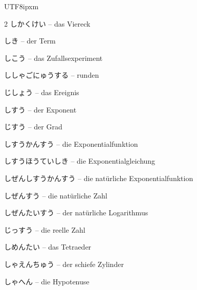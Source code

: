 \begin{CJK}{UTF8}{ipxm}
\begin{multicols}{2}
 {\footnotesize\color{black!70}しかくけい} -- das Viereck\dotfill\hyperref[e:196]{\pageref*{e:196}}\par
{} {\footnotesize\color{black!70}しき} -- der Term\dotfill\hyperref[e:72]{\pageref*{e:72}}\par
{} {\footnotesize\color{black!70}しこう} -- das Zufallsexperiment\dotfill\hyperref[e:326]{\pageref*{e:326}}\par
{} {\footnotesize\color{black!70}ししゃごにゅうする} -- runden\dotfill\hyperref[e:59]{\pageref*{e:59}}\par
{} {\footnotesize\color{black!70}じしょう} -- das Ereignis\dotfill\hyperref[e:328]{\pageref*{e:328}}\par
{} {\footnotesize\color{black!70}しすう} -- der Exponent\dotfill\hyperref[e:44]{\pageref*{e:44}}\par
{} {\footnotesize\color{black!70}じすう} -- der Grad\dotfill\hyperref[e:75]{\pageref*{e:75}}\par
{} {\footnotesize\color{black!70}しすうかんすう} -- die Exponentialfunktion\dotfill\hyperref[e:130]{\pageref*{e:130}}\par
{} {\footnotesize\color{black!70}しすうほうていしき} -- die Exponentialgleichung\dotfill\hyperref[e:84]{\pageref*{e:84}}\par
{} {\footnotesize\color{black!70}しぜんしすうかんすう} -- die natürliche Exponentialfunktion\dotfill\hyperref[e:299]{\pageref*{e:299}}\par
{} {\footnotesize\color{black!70}しぜんすう} -- die natürliche Zahl\dotfill\hyperref[e:5]{\pageref*{e:5}}\par
{} {\footnotesize\color{black!70}しぜんたいすう} -- der natürliche Logarithmus\dotfill\hyperref[e:300]{\pageref*{e:300}}\par
{} {\footnotesize\color{black!70}じっすう} -- die reelle Zahl\dotfill\hyperref[e:8]{\pageref*{e:8}}\par
{} {\footnotesize\color{black!70}しめんたい} -- das Tetraeder\dotfill\hyperref[e:234]{\pageref*{e:234}}\par
{} {\footnotesize\color{black!70}しゃえんちゅう} -- der schiefe Zylinder\dotfill\hyperref[e:238]{\pageref*{e:238}}\par
{} {\footnotesize\color{black!70}しゃへん} -- die Hypotenuse\dotfill\hyperref[e:186]{\pageref*{e:186}}\par

\end{multicols}
\end{CJK}
